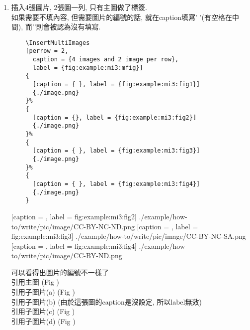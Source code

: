 \begin{enumerate}
{    e.g: 
    引用主圖 (Fig ) ,
    引用子圖片 (Fig , Fig ).
  } %

  \newpage
  \item
  {
    插入4張圖片, 2張圖一列, 只有主圖做了標簽.\\
    如果需要不填內容, 但需要圖片的編號的話, 就在caption填寫'{ }'(有空格在中間), 而'{}'則會被認為沒有填寫.
    \begin{verbatim}
    \InsertMultiImages
    [perrow = 2,
      caption = {4 images and 2 image per row},
      label = {fig:example:mi3:mfig}]
    {
      [caption = { }, label = {fig:example:mi3:fig1}]
      {./image.png}
    }%
    {
      [caption = {}, label = {fig:example:mi3:fig2}]
      {./image.png}
    }%
    {
      [caption = { }, label = {fig:example:mi3:fig3}]
      {./image.png}
    }%
    {
      [caption = { }, label = {fig:example:mi3:fig4}]
      {./image.png}
    }
    \end{verbatim}

    {
      [caption = {},
      label = {fig:example:mi3:fig2}]
      {./example/how-to/write/pic/image/CC-BY-NC-ND.png}
    }%
    {
      [caption = { },
      label = {fig:example:mi3:fig3}]
      {./example/how-to/write/pic/image/CC-BY-NC-SA.png}
    }%
    {
      [caption = { },
      label = {fig:example:mi3:fig4}]
      {./example/how-to/write/pic/image/CC-BY-ND.png}
    }

    可以看得出圖片的編號不一樣了\\
    引用主圖 (Fig )\\
    引用子圖片(a) (Fig )\\
    引用子圖片(b) (由於這張圖的caption是沒設定, 所以label無效)\\
    引用子圖片(c) (Fig )\\
    引用子圖片(d) (Fig )
  } %


\end{enumerate}
